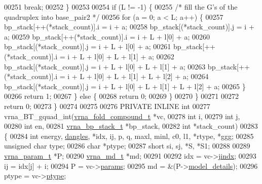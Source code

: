 \begin{DoxyCode}
00251         \textcolor{keywordflow}{break};
00252     \}
00253 
00254     \textcolor{keywordflow}{if} (L != -1) \{
00255       \textcolor{comment}{/* fill the G's of the quadruplex into base\_pair2 */}
00256       \textcolor{keywordflow}{for} (a = 0; a < L; a++) \{
00257         bp\_stack[++(*stack\_count)].i  = i + a;
00258         bp\_stack[(*stack\_count)].j    = i + a;
00259         bp\_stack[++(*stack\_count)].i  = i + L + l[0] + a;
00260         bp\_stack[(*stack\_count)].j    = i + L + l[0] + a;
00261         bp\_stack[++(*stack\_count)].i  = i + L + l[0] + L + l[1] + a;
00262         bp\_stack[(*stack\_count)].j    = i + L + l[0] + L + l[1] + a;
00263         bp\_stack[++(*stack\_count)].i  = i + L + l[0] + L + l[1] + L + l[2] + a;
00264         bp\_stack[(*stack\_count)].j    = i + L + l[0] + L + l[1] + L + l[2] + a;
00265       \}
00266       \textcolor{keywordflow}{return} 1;
00267     \} \textcolor{keywordflow}{else} \{
00268       \textcolor{keywordflow}{return} 0;
00269     \}
00270   \}
00271 
00272   \textcolor{keywordflow}{return} 0;
00273 \}
00274 
00275 
00276 PRIVATE INLINE \textcolor{keywordtype}{int}
00277 vrna\_BT\_gquad\_int(\hyperlink{group__fold__compound_structvrna__fc__s}{vrna\_fold\_compound\_t}  *vc,
00278                   \textcolor{keywordtype}{int}                   i,
00279                   \textcolor{keywordtype}{int}                   j,
00280                   \textcolor{keywordtype}{int}                   en,
00281                   \hyperlink{group__data__structures_structvrna__bp__stack__s}{vrna\_bp\_stack\_t}       *bp\_stack,
00282                   \textcolor{keywordtype}{int}                   *stack\_count)
00283 \{
00284   \textcolor{keywordtype}{int}           energy, \hyperlink{group__model__details_ga72b511ed1201f7e23ec437e468790d74}{dangles}, *idx, ij, p, q, maxl, minl, c0, l1, *rtype, *ggg;
00285   \textcolor{keywordtype}{unsigned} \textcolor{keywordtype}{char} type;
00286   \textcolor{keywordtype}{char}          *ptype;
00287   \textcolor{keywordtype}{short}         si, sj, *S, *S1;
00288 
00289   \hyperlink{group__energy__parameters_structvrna__param__s}{vrna\_param\_t}  *P;
00290   \hyperlink{group__model__details_structvrna__md__s}{vrna\_md\_t}     *md;
00291 
00292   idx     = vc->\hyperlink{group__fold__compound_a5037235dee512efd85ca543780bbca1a}{jindx};
00293   ij      = idx[j] + i;
00294   P       = vc->\hyperlink{group__fold__compound_a19b8720c2c5321c1b97c830bd17566ea}{params};
00295   md      = &(P->\hyperlink{group__energy__parameters_a7b84353eb9075c595bad4ceb871bcae7}{model\_details});
00296   ptype   = vc->\hyperlink{group__fold__compound_a3fbea559f1d1976b2d67c215cdeee0b2}{ptype};

\end{DoxyCode}
